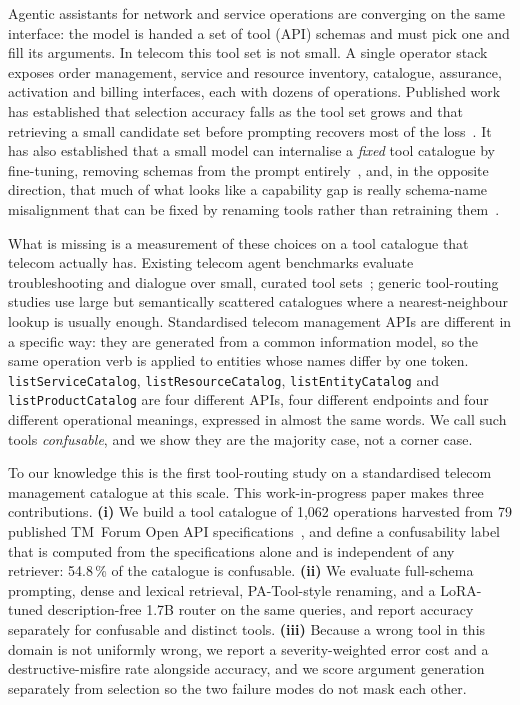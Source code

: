 Agentic assistants for network and service operations are converging on the
same interface: the model is handed a set of tool (API) schemas and must pick
one and fill its arguments. In telecom this tool set is not small. A single
operator stack exposes order management, service and resource inventory,
catalogue, assurance, activation and billing interfaces, each with dozens of
operations. Published work has established that selection accuracy falls as the
tool set grows and that retrieving a small candidate set before prompting
recovers most of the loss~\cite{ragmcp,toollery}. It has also
established that a small model can internalise a \emph{fixed} tool catalogue by
fine-tuning, removing schemas from the prompt
entirely~\cite{qlora_tools}, and, in the opposite direction, that much of
what looks like a capability gap is really schema-name misalignment that can be
fixed by renaming tools rather than retraining them~\cite{patool}.

What is missing is a measurement of these choices on a tool catalogue that
telecom actually has. Existing telecom agent benchmarks evaluate
troubleshooting and dialogue over small, curated tool sets~\cite{telcoagent,ctbench,wirelessbench};
generic tool-routing studies use large but semantically scattered catalogues
where a nearest-neighbour lookup is usually enough. Standardised telecom
management APIs are different in a specific way: they are generated from a
common information model, so the same operation verb is applied to entities
whose names differ by one token. \texttt{listServiceCatalog},
\texttt{listResourceCatalog}, \texttt{listEntityCatalog} and
\texttt{listProductCatalog} are four different APIs, four different endpoints
and four different operational meanings, expressed in almost the same words.
We call such tools \emph{confusable}, and we show they are the majority case,
not a corner case.

To our knowledge this is the first tool-routing study on a standardised
telecom management catalogue at this scale. This work-in-progress paper makes
three contributions.
\textbf{(i)} We build a tool catalogue of 1,062 operations harvested from
79 published TM~Forum Open API specifications~\cite{tmforum}, and define a
confusability label that is computed from the specifications alone and is
independent of any retriever: 54.8\,\% of the catalogue is confusable.
\textbf{(ii)} We evaluate full-schema prompting, dense and lexical retrieval,
PA-Tool-style renaming, and a LoRA-tuned description-free 1.7B router on the
same queries, and report accuracy separately for confusable and distinct tools.
\textbf{(iii)} Because a wrong tool in this domain is not uniformly wrong, we
report a severity-weighted error cost and a destructive-misfire rate alongside
accuracy, and we score argument generation separately from selection so the two
failure modes do not mask each other.
